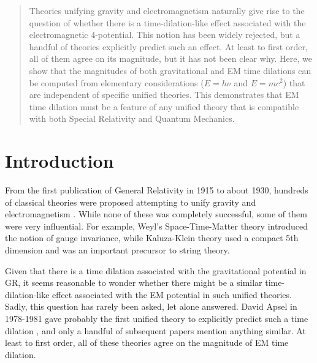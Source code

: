 \date{Received: date / Accepted: date}


\maketitle

\begin{abstract}
Theories unifying gravity and electromagnetism naturally give rise to the question
of whether there is a time-dilation-like effect associated with the electromagnetic 4-potential.
This notion has been widely rejected, but a handful of theories explicitly predict such an effect. \cite{Apsel1978,Apsel1979,Apsel1981,Rodrigues1983,Ryff1985,Beil1987,vanHolten1992}
At least to first order, all of them agree on its magnitude, but it has not been clear why.
Here, we show that the magnitudes of both gravitational and EM time dilations
can be computed from elementary considerations
($E=h\nu$ and $E=mc^2$)
that are independent of specific unified theories.
This demonstrates that EM time dilation must be a feature of any unified theory
that is compatible with both Special Relativity and Quantum Mechanics.
\end{abstract}

\section{Introduction}
\label{intro}

From the first publication of General Relativity in 1915 to about 1930, hundreds of classical theories
were proposed attempting to unify gravity and electromagnetism \cite{Vizgin1994}.
While none of these was completely successful, some of them were very influential.
For example, Weyl's Space-Time-Matter theory \cite{Weyl1923} introduced the notion of gauge invariance,
while Kaluza-Klein theory \cite{Kaluza1921,Klein1926} used a compact 5th dimension
and was an important precursor to string theory.

Given that there is a time dilation associated with the gravitational potential in GR,
it seems reasonable to wonder whether there might be a similar time-dilation-like effect
associated with the EM potential in such unified theories.
Sadly, this question has rarely been asked, let alone answered.
David Apsel in 1978-1981 gave probably the first unified theory to explicitly predict such a time dilation \cite{Apsel1978,Apsel1979,Apsel1981},
and only a handful of subsequent papers \cite{Rodrigues1983,Ryff1985,Beil1987,vanHolten1992} mention anything similar.
At least to first order,
all of these theories agree on the magnitude of EM time dilation.


